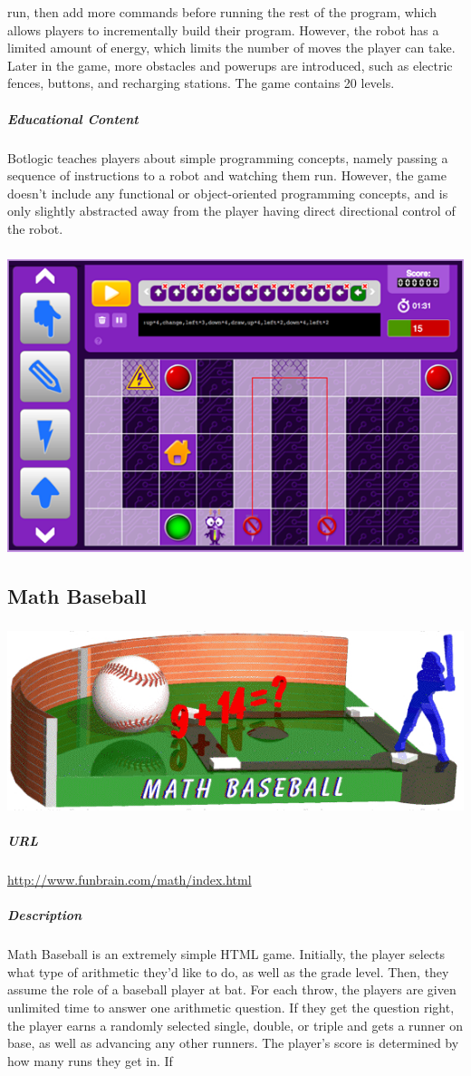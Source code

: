 run, then add more commands before running the rest of the program, which allows players to incrementally build their program. However, the robot has a limited amount of energy, which limits the number of moves the player can take. Later in the game, more obstacles and powerups are introduced, such as electric fences, buttons, and recharging stations. The game contains 20 levels.\subparagraph{Educational Content}Botlogic teaches players about simple programming concepts, namely passing a sequence of instructions to a robot and watching them run. However, the game doesn't include any functional or object-oriented programming concepts, and is only slightly abstracted away from the player having direct directional control of the robot.\subparagraph{}\includegraphics[width = \textwidth]{img/botlogic_screen.png}\subsection{Math Baseball}\subparagraph{}\includegraphics[width = \textwidth]{img/baseball_title.jpg}\subparagraph{URL}\url{http://www.funbrain.com/math/index.html}\subparagraph{Description}Math Baseball is an extremely simple HTML game. Initially, the player selects what type of arithmetic they'd like to do, as well as the grade level. Then, they assume the role of a baseball player at bat. For each throw, the players are given unlimited time to answer one arithmetic question. If they get the question right, the player earns a randomly selected single, double, or triple and gets a runner on base, as well as advancing any other runners. The player's score is determined by how many runs they get in. If 